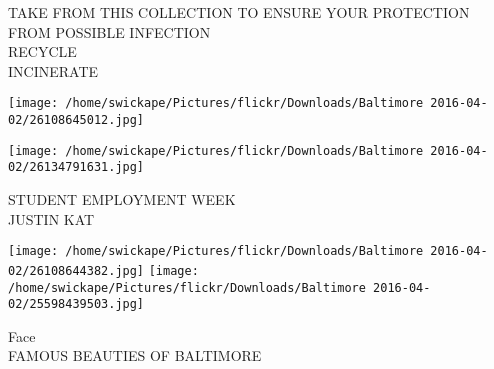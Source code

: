 \documentclass[10pt,letterpaper]{article}
\begin{document}
TAKE FROM THIS COLLECTION TO ENSURE YOUR PROTECTION FROM POSSIBLE INFECTION\\
RECYCLE\\
INCINERATE
\pagebreak

\texttt{[image: /home/swickape/Pictures/flickr/Downloads/Baltimore 2016-04-02/26108645012.jpg]}

\vspace{0.25in}
\texttt{[image: /home/swickape/Pictures/flickr/Downloads/Baltimore 2016-04-02/26134791631.jpg]}

STUDENT EMPLOYMENT WEEK\\
JUSTIN KAT
\pagebreak

\texttt{[image: /home/swickape/Pictures/flickr/Downloads/Baltimore 2016-04-02/26108644382.jpg]}
\texttt{[image: /home/swickape/Pictures/flickr/Downloads/Baltimore 2016-04-02/25598439503.jpg]}

Face\\
FAMOUS BEAUTIES OF BALTIMORE
\pagebreak
\end{document}
